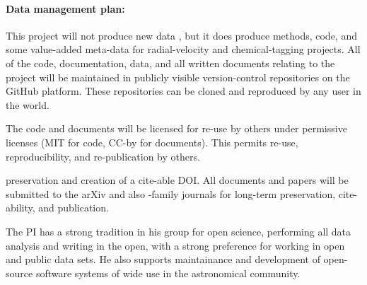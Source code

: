 \documentclass[12pt, fullpage, letterpaper]{article}
\begin{document}
\paragraph{Data management plan:}
This project will not produce new data , but it does produce
methods, code, and some value-added meta-data for radial-velocity and
chemical-tagging projects.
All of the code, documentation, data, and all written documents relating to the
project will be maintained in publicly visible version-control repositories on
the GitHub platform. These repositories can be cloned and reproduced by any
user in the world.

The code and documents will be licensed for re-use by others under permissive
licenses (MIT for code, CC-by for documents). This permits re-use, reproducibility,
and re-publication by others.

preservation and creation of a cite-able DOI.
All documents and papers will be submitted to the arXiv and also \AAS-family
journals for long-term preservation, cite-ability, and publication.

The PI has a strong tradition in his group for open science, performing
all data analysis and writing in the open, with a strong preference for working
in open and public data sets. He also supports maintainance and development of
open-source software systems of wide use in the astronomical community.
\end{document}
